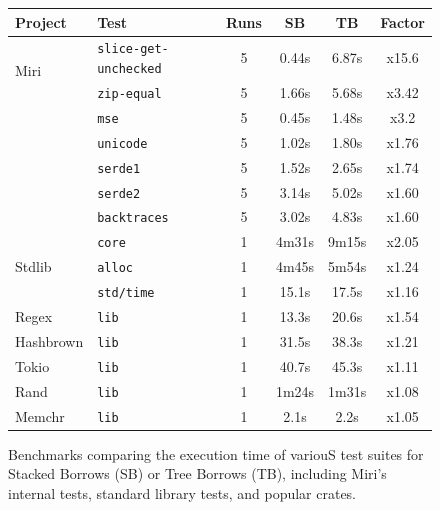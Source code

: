 \documentclass[a4paper,11pt]{article}
\theoremstyle{plain}
\theoremstyle{definition}
\theoremstyle{remark}
\begin{document}
\begin{figure}
    \centering
    \begin{tabular}{|l|l|c|c|c|c|}
        \hline
        Project & Test & Runs & SB & TB & Factor \\
        \hline
        \multirow{2}{9em}{Miri}
            & \texttt{slice-get-unchecked} & 5 & 0.44s & 6.87s & {\color{Red}x15.6} \\
            & \texttt{zip-equal} & 5 & 1.66s & 5.68s & {\color{Red}x3.42} \\
            & \texttt{mse} & 5 & 0.45s & 1.48s & {\color{Red}x3.2} \\
            & \texttt{unicode} & 5 & 1.02s & 1.80s & {\color{YellowOrange}x1.76} \\
            & \texttt{serde1} & 5 & 1.52s & 2.65s & {\color{YellowOrange}x1.74} \\
            & \texttt{serde2} & 5 & 3.14s & 5.02s & {\color{YellowOrange}x1.60} \\
            & \texttt{backtraces} & 5 & 3.02s & 4.83s & {\color{YellowOrange}x1.60} \\
        \hline
        \multirow{3}{9em}{Stdlib}
            & \texttt{core} & 1 & 4m31s & 9m15s & {\color{Red}x2.05} \\
            & \texttt{alloc} & 1 & 4m45s & 5m54s & {\color{LimeGreen}x1.24} \\
            & \texttt{std/time} & 1 & 15.1s & 17.5s & {\color{LimeGreen}x1.16} \\
        \hline
        \multirow{1}{9em}{Regex}
            & \texttt{lib} & 1 & 13.3s & 20.6s & {\color{YellowOrange}x1.54} \\
        \multirow{1}{9em}{Hashbrown}
            & \texttt{lib} & 1 & 31.5s & 38.3s & {\color{LimeGreen}x1.21} \\
        \multirow{1}{9em}{Tokio}
            & \texttt{lib} & 1 & 40.7s & 45.3s & {\color{LimeGreen}x1.11} \\
        \multirow{1}{9em}{Rand}
            & \texttt{lib} & 1 & 1m24s & 1m31s & {\color{LimeGreen}x1.08} \\
        \multirow{1}{9em}{Memchr}
            & \texttt{lib} & 1 & 2.1s & 2.2s & {\color{LimeGreen}x1.05} \\
        \hline
    \end{tabular}
    \caption{
        Benchmarks comparing the execution time of variouS test suites
        for Stacked Borrows (SB) or Tree Borrows (TB), including
        Miri's internal tests, standard library tests, and popular crates.
}
\end{figure}
\end{document}
